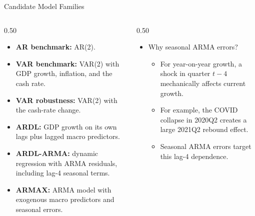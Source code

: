 \documentclass[aspectratio=169,10pt]{beamer}
\begin{document}
\begin{frame}{Candidate Model Families}
\begin{columns}[T,onlytextwidth]
\begin{column}{0.50\textwidth}
\begin{itemize}
    \item \textbf{AR benchmark:} AR(2).
    \item \textbf{VAR benchmark:} VAR(2) with GDP growth, inflation, and the cash rate.
    \item \textbf{VAR robustness:} VAR(2) with the cash-rate change.
    \item \textbf{ARDL:} GDP growth on its own lags plus lagged macro predictors.
    \item \textbf{ARDL-ARMA:} dynamic regression with ARMA residuals, including lag-4 seasonal terms.
    \item \textbf{ARMAX:} ARMA model with exogenous macro predictors and seasonal errors.
\end{itemize}
\end{column}
\begin{column}{0.50\textwidth}
\begin{itemize}
    \item Why seasonal ARMA errors?
    \begin{itemize}
        \item For year-on-year growth, a shock in quarter $t-4$ mechanically affects current growth.
        \item For example, the COVID collapse in 2020Q2 creates a large 2021Q2 rebound effect.
        \item Seasonal ARMA errors target this lag-4 dependence.
    \end{itemize}
\end{itemize}
\end{column}
\end{columns}
\end{frame}
\end{document}
